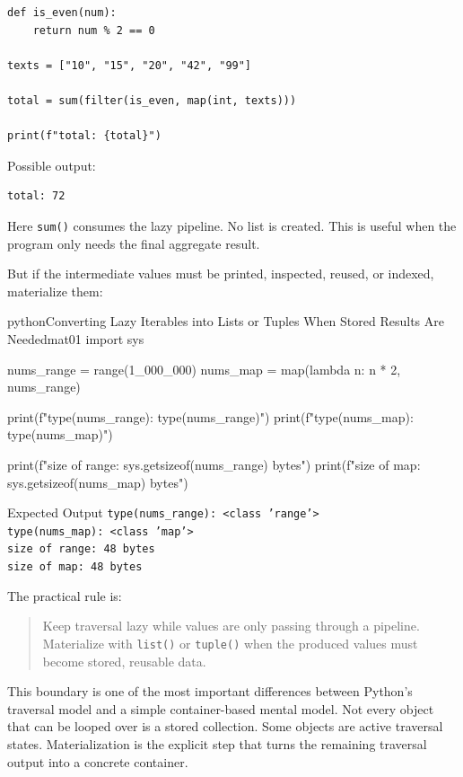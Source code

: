 \documentclass[a4paper,twoside]{report}
\begin{document}
\begin{verbatim}
def is_even(num):
    return num % 2 == 0

texts = ["10", "15", "20", "42", "99"]

total = sum(filter(is_even, map(int, texts)))

print(f"total: {total}")
\end{verbatim}

Possible output:

\begin{verbatim}
total: 72
\end{verbatim}

Here \texttt{sum()} consumes the lazy pipeline. No list is created. This is useful when the program only needs the final aggregate result.

But if the intermediate values must be printed, inspected, reused, or indexed, materialize them:

\begin{codebox}[]{python}{Converting Lazy Iterables into Lists or Tuples When Stored Results Are Needed}{mat01}
import sys

nums_range = range(1_000_000)
nums_map = map(lambda n: n * 2, nums_range)

print(f"type(nums_range): {type(nums_range)}")
print(f"type(nums_map): {type(nums_map)}")

print(f"size of range: {sys.getsizeof(nums_range)} bytes")
print(f"size of map:   {sys.getsizeof(nums_map)} bytes")
\end{codebox}


\begin{iobox}{Expected Output}
\texttt{type(nums\_range): <class 'range'>} \\
\texttt{type(nums\_map): <class 'map'>} \\
\texttt{size of range: 48 bytes} \\
\texttt{size of map:   48 bytes} \\
\end{iobox}




The practical rule is:

\begin{quote}
Keep traversal lazy while values are only passing through a pipeline. Materialize with \texttt{list()} or \texttt{tuple()} when the produced values must become stored, reusable data.
\end{quote}

This boundary is one of the most important differences between Python's traversal model and a simple container-based mental model. Not every object that can be looped over is a stored collection. Some objects are active traversal states. Materialization is the explicit step that turns the remaining traversal output into a concrete container.
\end{document}
